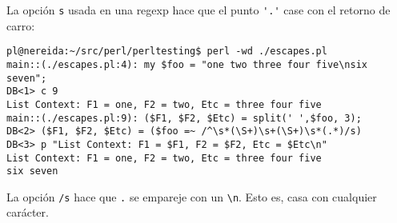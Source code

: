 
La opción \verb|s| usada en una regexp 
hace que el punto \verb|'.'| case con el retorno
de carro:

\begin{latexonly}
\begin{verbatim}
pl@nereida:~/src/perl/perltesting$ perl -wd ./escapes.pl
main::(./escapes.pl:4): my $foo = "one two three four five\nsix seven";
DB<1> c 9
List Context: F1 = one, F2 = two, Etc = three four five
main::(./escapes.pl:9): ($F1, $F2, $Etc) = split(' ',$foo, 3);
DB<2> ($F1, $F2, $Etc) = ($foo =~ /^\s*(\S+)\s+(\S+)\s*(.*)/s)
DB<3> p "List Context: F1 = $F1, F2 = $F2, Etc = $Etc\n"
List Context: F1 = one, F2 = two, Etc = three four five
six seven
\end{verbatim}
\end{latexonly}


La opción \verb|/s| hace que \verb|.| se empareje con 
un \verb|\n|.
Esto es, casa con cualquier carácter.

